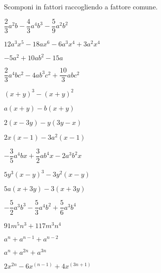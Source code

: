 

\begin{esercizio}
\label{ese:div.011}
Scomponi in fattori raccogliendo a fattore comune.
\begin{htmulticols}{2}
\begin{enumeratea}
\item \(\dfrac{2}{3}a^{2}b-\dfrac{4}{3}a^{4}b^{3}-\dfrac{5}{9}a^{2}b^{2}\)
\item \(12a^{3}x^{5}-18ax^{6}-6a^{3}x^{4}+3a^{2}x^{4}\)
\item \(-5a^{2}+10ab^{2}-15a\)
\item \(\dfrac{2}{3}a^{4}bc^{2}-4ab^{3}c^{2}+\dfrac{10}{3}abc^{2}\)
\item \((x+y)^{3}-(x+y)^{2}\)
\item \(a(x+y)-b(x+y)\)
\item \(2(x-3y)-y(3y-x)\)
\item \(2x(x-1)-3a^{2}(x-1)\)
\item \(-{\dfrac{3}{5}}a^{4}bx+\dfrac{3}{2}ab^{4}x-2a^{3}b^{2}x\)
\item \(5y^{3}(x-y)^{3}-3y^{2}(x-y)\)
\item \(5a(x+3y)-3(x+3y)\)
\item 
\(-{\dfrac{5}{2}}a^{3}b^{3}-\dfrac{5}{3}a^{4}b^{2}+\dfrac{5}{6}a^{3}b^{4}\)
\item \(91m^{5}n^{3}+117m^{3}n^{4}\)
\item \(a^{n}+a^{n-1}+a^{n-2}\)
 \item \(a^{n}+a^{2n}+a^{3n}\)
 \item \(2x^{2n}-6x^{(n-1)}+4x^{(3n+1)}\)
\end{enumeratea}
\end{htmulticols}
\end{esercizio}


